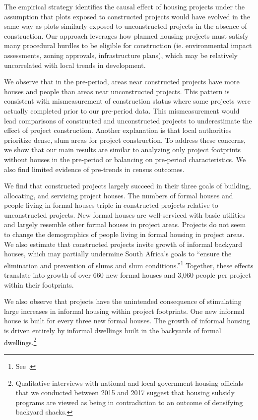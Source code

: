 \documentclass[12pt]{article}
\newcommand{\rv}{}
\begin{document}
The empirical strategy identifies the causal effect of housing projects under the assumption that plots exposed to constructed projects would have evolved in the same way as plots similarly exposed to unconstructed projects in the absence of construction.  Our approach leverages how planned housing projects must satisfy many procedural hurdles to be eligible for construction (ie. environmental impact assessments, zoning approvals, infrastructure plans), which \rv{may be relatively uncorrelated} with local trends in development.  

\rv{We observe that in the pre-period, areas near constructed projects have more houses and people than areas near unconstructed projects.  This pattern is consistent with mismeasurement of construction status where some projects were actually completed prior to our pre-period data.  This mismeasurement would lead comparisons of constructed and unconstructed projects to underestimate the effect of project construction.}  Another explanation is that local authorities prioritize dense, slum areas for project construction.  To address these concerns, we show that our main results are similar to analyzing only project footprints without houses in the pre-period or balancing on pre-period characteristics.  We also find limited evidence of pre-trends in census outcomes.


\rv{We find that constructed projects largely succeed in their three goals of building, allocating, and servicing project houses.  The numbers of formal houses and people living in formal houses triple in constructed projects relative to unconstructed projects.  New formal houses are well-serviced with basic utilities and largely resemble other formal houses in project areas.  Projects do not seem to change the demographics of people living in formal housing in project areas.  } We also estimate that constructed projects invite growth of informal backyard houses, which may partially undermine South Africa's goals to ``ensure the elimination and prevention of slums and slum conditions.''\footnote{See \cite{housingact}.}  Together, these effects translate into growth of over \rv{660 new formal houses and 3,060 people per project} within their footprints.

\rv{We also observe that projects have the unintended consequence of stimulating large increases in informal housing within project footprints. One new informal house is built for every three new formal houses.  The growth of informal housing is driven entirely by informal dwellings built in the backyards of formal dwellings\citep{Brueckner2018backyarding}.\footnote{Qualitative interviews with national and local government housing officials that we conducted between 2015 and 2017 suggest that housing subsidy programs are viewed as being in contradiction to an outcome of densifying backyard shacks.} }
\end{document}

